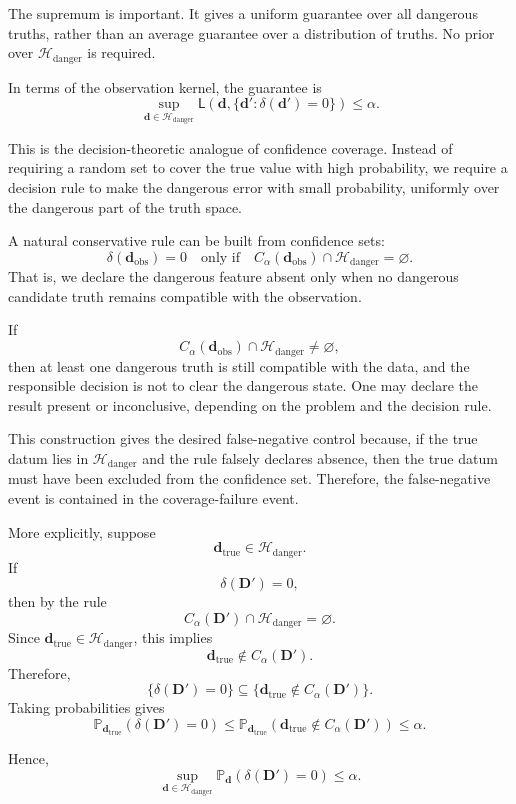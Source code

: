 \documentclass[11pt]{article}
\newcommand{\Dobsrand}{\mathbf D'}
\newcommand{\dtrue}{\mathbf d_{\mathrm{true}}}
\newcommand{\dobs}{\mathbf d_{\mathrm{obs}}}
\newcommand{\Calpha}{C_{\alpha}}
\newcommand{\Prob}{\mathbb P}
\begin{document}
The supremum is important. It gives a uniform guarantee over all dangerous truths, rather than an average guarantee over a distribution of truths. No prior over \(\mathcal H_{\mathrm{danger}}\) is required.

In terms of the observation kernel, the guarantee is
\[
    \sup_{\mathbf d\in\mathcal H_{\mathrm{danger}}}
    \mathsf L
    \left(
        \mathbf d,
        \{\mathbf d':\delta(\mathbf d')=0\}
    \right)
    \leq
    \alpha.
\]

This is the decision-theoretic analogue of confidence coverage. Instead of requiring a random set to cover the true value with high probability, we require a decision rule to make the dangerous error with small probability, uniformly over the dangerous part of the truth space.

A natural conservative rule can be built from confidence sets:
\[
    \delta(\dobs)=0
    \quad
    \text{only if}
    \quad
    \Calpha(\dobs)\cap\mathcal H_{\mathrm{danger}}=\varnothing.
\]
That is, we declare the dangerous feature absent only when no dangerous candidate truth remains compatible with the observation.

If
\[
    \Calpha(\dobs)\cap\mathcal H_{\mathrm{danger}}\neq\varnothing,
\]
then at least one dangerous truth is still compatible with the data, and the responsible decision is not to clear the dangerous state. One may declare the result present or inconclusive, depending on the problem and the decision rule.

This construction gives the desired false-negative control because, if the true datum lies in \(\mathcal H_{\mathrm{danger}}\) and the rule falsely declares absence, then the true datum must have been excluded from the confidence set. Therefore, the false-negative event is contained in the coverage-failure event.

More explicitly, suppose
\[
    \dtrue\in\mathcal H_{\mathrm{danger}}.
\]
If
\[
    \delta(\Dobsrand)=0,
\]
then by the rule
\[
    \Calpha(\Dobsrand)\cap\mathcal H_{\mathrm{danger}}=\varnothing.
\]
Since \(\dtrue\in\mathcal H_{\mathrm{danger}}\), this implies
\[
    \dtrue\notin\Calpha(\Dobsrand).
\]
Therefore,
\[
    \{\delta(\Dobsrand)=0\}
    \subseteq
    \{\dtrue\notin\Calpha(\Dobsrand)\}.
\]
Taking probabilities gives
\[
    \Prob_{\dtrue}
    \left(
        \delta(\Dobsrand)=0
    \right)
    \leq
    \Prob_{\dtrue}
    \left(
        \dtrue\notin\Calpha(\Dobsrand)
    \right)
    \leq
    \alpha.
\]

Hence,
\[
    \sup_{\mathbf d\in\mathcal H_{\mathrm{danger}}}
    \Prob_{\mathbf d}
    \left(
        \delta(\Dobsrand)=0
    \right)
    \leq
    \alpha.
\]
\end{document}

